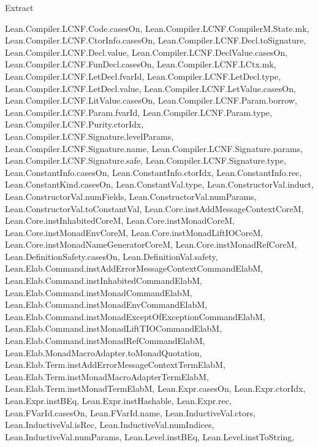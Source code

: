 \begin{lexlean}{Extract}
\begin{toolingmodule}
{{        Lean.Compiler.LCNF.Code.casesOn,
        Lean.Compiler.LCNF.CompilerM.State.mk,
        Lean.Compiler.LCNF.CtorInfo.casesOn,
        Lean.Compiler.LCNF.Decl.toSignature,
        Lean.Compiler.LCNF.Decl.value,
        Lean.Compiler.LCNF.DeclValue.casesOn,
        Lean.Compiler.LCNF.FunDecl.casesOn,
        Lean.Compiler.LCNF.LCtx.mk,
        Lean.Compiler.LCNF.LetDecl.fvarId,
        Lean.Compiler.LCNF.LetDecl.type,
        Lean.Compiler.LCNF.LetDecl.value,
        Lean.Compiler.LCNF.LetValue.casesOn,
        Lean.Compiler.LCNF.LitValue.casesOn,
        Lean.Compiler.LCNF.Param.borrow,
        Lean.Compiler.LCNF.Param.fvarId,
        Lean.Compiler.LCNF.Param.type,
        Lean.Compiler.LCNF.Purity.ctorIdx,
        Lean.Compiler.LCNF.Signature.levelParams,
        Lean.Compiler.LCNF.Signature.name,
        Lean.Compiler.LCNF.Signature.params,
        Lean.Compiler.LCNF.Signature.safe,
        Lean.Compiler.LCNF.Signature.type,
        Lean.ConstantInfo.casesOn,
        Lean.ConstantInfo.ctorIdx,
        Lean.ConstantInfo.rec,
        Lean.ConstantKind.casesOn,
        Lean.ConstantVal.type,
        Lean.ConstructorVal.induct,
        Lean.ConstructorVal.numFields,
        Lean.ConstructorVal.numParams,
        Lean.ConstructorVal.toConstantVal,
        Lean.Core.instAddMessageContextCoreM,
        Lean.Core.instInhabitedCoreM,
        Lean.Core.instMonadCoreM,
        Lean.Core.instMonadEnvCoreM,
        Lean.Core.instMonadLiftIOCoreM,
        Lean.Core.instMonadNameGeneratorCoreM,
        Lean.Core.instMonadRefCoreM,
        Lean.DefinitionSafety.casesOn,
        Lean.DefinitionVal.safety,
        Lean.Elab.Command.instAddErrorMessageContextCommandElabM,
        Lean.Elab.Command.instInhabitedCommandElabM,
        Lean.Elab.Command.instMonadCommandElabM,
        Lean.Elab.Command.instMonadEnvCommandElabM,
        Lean.Elab.Command.instMonadExceptOfExceptionCommandElabM,
        Lean.Elab.Command.instMonadLiftTIOCommandElabM,
        Lean.Elab.Command.instMonadRefCommandElabM,
        Lean.Elab.MonadMacroAdapter.toMonadQuotation,
        Lean.Elab.Term.instAddErrorMessageContextTermElabM,
        Lean.Elab.Term.instMonadMacroAdapterTermElabM,
        Lean.Elab.Term.instMonadTermElabM,
        Lean.Expr.casesOn,
        Lean.Expr.ctorIdx,
        Lean.Expr.instBEq,
        Lean.Expr.instHashable,
        Lean.Expr.rec,
        Lean.FVarId.casesOn,
        Lean.FVarId.name,
        Lean.InductiveVal.ctors,
        Lean.InductiveVal.isRec,
        Lean.InductiveVal.numIndices,
        Lean.InductiveVal.numParams,
        Lean.Level.instBEq,
        Lean.Level.instToString,
}}
\end{toolingmodule}
\end{lexlean}
